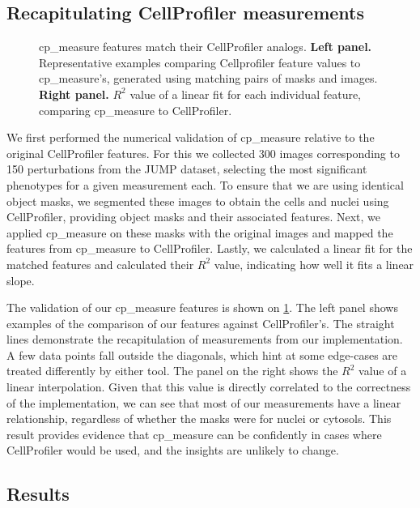 \documentclass{article}
\begin{document}
\subsection{Recapitulating CellProfiler measurements}
\label{sec:org09b0cd2}

\begin{figure}[htbp]
\centering

\caption{\label{fig:cp_vs_cpmeasure}cp\_measure features match their CellProfiler analogs. \textbf{Left panel.} Representative examples comparing Cellprofiler feature values to cp\_measure's, generated using matching pairs of masks and images. \textbf{Right panel.} \(R^2\) value of a linear fit for each individual feature, comparing cp\_measure to CellProfiler.}
\end{figure}

We first performed the numerical validation of cp\_measure relative to the original CellProfiler features. For this we collected 300 images corresponding to 150 perturbations from the JUMP dataset, selecting the most significant phenotypes for a given measurement each. To ensure that we are using identical object masks, we segmented these images to obtain the cells and nuclei using CellProfiler, providing object masks and their associated features. Next, we applied cp\_measure on these masks with the original images and mapped the features from cp\_measure to CellProfiler. Lastly, we calculated a linear fit for the matched features and calculated their \(R^2\) value, indicating how well it fits a linear slope.

The validation of our cp\_measure features is shown on \ref{fig:cp_vs_cpmeasure}. The left panel shows examples of the comparison of our features against CellProfiler's. The straight lines demonstrate the recapitulation of measurements from our implementation. A few data points fall outside the diagonals, which hint at some edge-cases are treated differently by either tool. The panel on the right shows the \(R^2\) value of a linear interpolation. Given that this value is directly correlated to the correctness of the implementation, we can see that most of our measurements have a linear relationship, regardless of whether the masks were for nuclei or cytosols. This result provides evidence that cp\_measure can be confidently in cases where CellProfiler would be used, and the insights are unlikely to change.
\subsection{Results}
\label{sec:orge5b5c6b}
\end{document}

